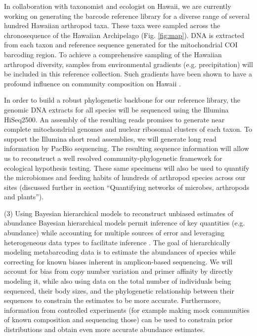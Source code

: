 \documentclass[11pt]{article}
\makeatletter
\renewcommand{\paragraph}{\@startsection{paragraph}{4}{\z@}
  {1ex \@plus 1ex \@minus .2ex}{-1em}
  {\normalfont\normalsize\it}
}
\makeatother
\begin{document}
In collaboration with taxonomist and ecologist on Hawaii, we are
currently working on generating the barcode reference library for a
diverse range of several hundred Hawaiian arthropod taxa. These taxa
were sampled across the chronosequence of the Hawaiian Archipelago
(Fig. \ref{fig:map}). DNA is extracted from each taxon and reference
sequence generated for the mitochondrial COI barcoding region. To
achieve a comprehensive sampling of the Hawaiian arthropod diversity,
samples from environmental gradients (e.g. precipitation) will be
included in this reference collection. Such gradients have been shown
to have a profound influence on community composition on Hawaii
\citep{zimmerman2012}.

In order to build a robust phylogenetic backbone for our reference
library, the genomic DNA extracts for all species will be sequenced
using the Illumina HiSeq2500. An assembly of the resulting reads
promises to generate near complete mitochondrial genomes and nuclear
ribosomal clusters of each taxon. To support the Illumina short read
assemblies, we will generate long read information by PacBio
sequencing. The resulting sequence information will allow us to
reconstruct a well resolved community-phylogenetic framework for
ecological hypothesis testing.  These same specimens will also be used
to quantify the microbiomes and feeding habits of hundreds of
arthropod species across our sites (discussed further in section
``Quantifying networks of microbes, arthropods and plants'').

\paragraph{(3) Using Bayesian hierarchical models to reconstruct
  unbiased estimates of abundance}
Bayesian hierarchical models permit inference of key quantities
(e.g. abundance) while accounting for multiple sources of error and
leveraging heterogeneous data types to facilitate inference
\citep{royleDorazio}.  The goal of hierarchically modeling
metabarcoding data is to estimate the abundances of species while
correcting for known biases inherent in amplicon-based sequencing.  We
will account for bias from copy number variation and primer affinity
\citep{elbrecht2015} by directly modeling it, while also using data on
the total number of individuals being sequenced, their body sizes, and
the phylogenetic relationship between their sequences to constrain the
estimates to be more accurate.  Furthermore, information from
controlled experiments (for example making mock communities of known
composition and sequencing those) can be used to constrain prior
distributions and obtain even more accurate abundance estimates.
\end{document}
